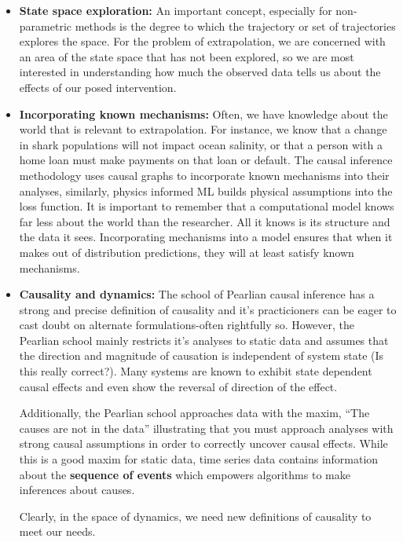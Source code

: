 \documentclass{article}
\begin{document}
        \begin{itemize}
            \item \textbf{State space exploration:} An important concept, especially for non-parametric methods is the degree to 
            which the trajectory or set of trajectories explores the space. For the problem of extrapolation, we are concerned with
            an area of the state space that has not been explored, so we are most interested in understanding how much the
            observed data tells us about the effects of our posed intervention.

            \item \textbf{Incorporating known mechanisms:} Often, we have knowledge about the world that is relevant to
            extrapolation. For instance, we know that a change in shark populations will not impact ocean salinity, or that
            a person with a home loan must make payments on that loan or default. The causal inference methodology uses
            causal graphs to incorporate known mechanisms into their analyses, similarly, physics informed ML builds
            physical assumptions into the loss function. It is important to remember that a computational model knows far
            less about the world than the researcher. All it knows is its structure and the data it sees. Incorporating
            mechanisms into a model ensures that when it makes out of distribution predictions, they will at least
            satisfy known mechanisms.

            \item \textbf{Causality and dynamics:} The school of Pearlian causal inference has a strong and precise definition of
            causality and it's practicioners can be eager to cast doubt on alternate formulations-often rightfully so.
            However, the Pearlian school mainly restricts it's analyses to static data and assumes that the direction and
            magnitude of causation is independent of system state (Is this really correct?). Many systems are known to
            exhibit state dependent causal effects and even show the reversal of direction of the effect.

            Additionally, the Pearlian school approaches data with the maxim, ``The causes are not in the data'' illustrating
            that you must approach analyses with strong causal assumptions in order to correctly uncover causal effects.
            While this is a good maxim for static data, time series data contains information about the \textbf{sequence of events}
            which empowers algorithms to make inferences about causes.

            Clearly, in the space of dynamics, we need new definitions of causality to meet our needs.
         
        \end{itemize}
\end{document}
